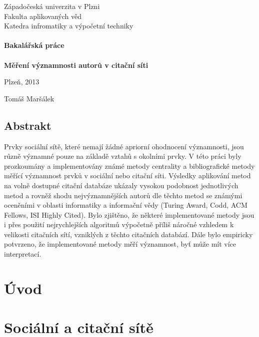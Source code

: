 \documentclass[12pt,titlepage]{report}
\begin{document}
\begin{titlepage}
\begin{center}
	\Large{Západočeská univerzita v Plzni} \\
	\Large{Fakulta aplikovaných věd} \\
	\Large{Katedra infromatiky a výpočetní techniky} \\
\mbox{} \\[1.6cm]
	\LARGE{{\bf Bakalářská práce}} \\
\mbox{} \\
	\Huge{{\bf Měření významnosti autorů v citační síti}} \\
\end{center}
\vfill
\begin{minipage}{.5\textwidth}
Plzeň, 2013
\end{minipage}
\begin{minipage}{.5\textwidth}
\hfill Tomáš Maršálek
\end{minipage}
\thispagestyle{empty}
\end{titlepage}

\section*{Abstrakt}
Prvky sociální sítě, které nemají žádné apriorní ohodnocení významnosti, jsou
různě významné pouze na základě vztahů s okolními prvky. V této práci byly
prozkoumány a implementovány známé metody centrality a bibliografické metody
měřící významnost prvků v sociální nebo citační síti. Výsledky aplikování metod
na volně dostupné citační databáze ukázaly vysokou podobnost jednotlivých metod
a rovněž shodu nejvýznamnějších autorů dle těchto metod se známými oceněními v
oblasti informatiky a informační vědy (Turing Award, Codd, ACM Fellows, ISI
Highly Cited). Bylo zjištěno, že některé implementované metody jsou i přes
použití nejrychlejších algoritmů výpočetně příliš náročné vzhledem k velikosti
citačních sítí, vzniklých z těchto citačních databází. Dále bylo empiricky
potvrzeno, že implementované metody měří významnost, byť může mít více
interpretací.

\tableofcontents

\chapter{Úvod}

\chapter{Sociální a citační sítě}
\end{document}

